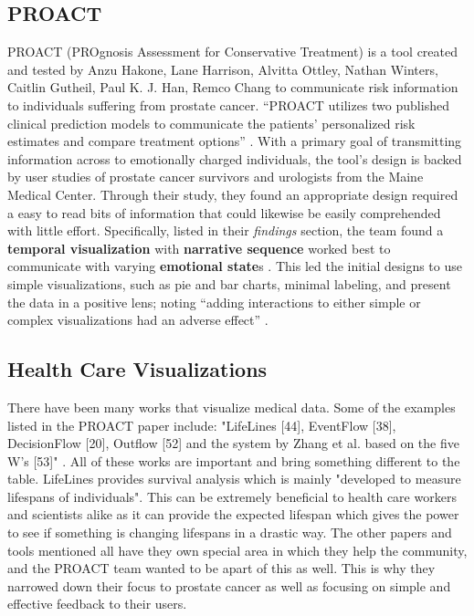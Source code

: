 \documentclass[journal]{vgtc}                %
\begin{document}
        \subsection{PROACT}
                PROACT (PROgnosis Assessment for Conservative Treatment) is a tool created and tested by Anzu Hakone, Lane Harrison, Alvitta Ottley, Nathan Winters, Caitlin Gutheil, Paul K. J. Han, Remco Chang to communicate risk information to individuals suffering from prostate cancer.
                ``PROACT utilizes two published clinical prediction models to communicate the patients’ personalized risk estimates and compare treatment options'' \cite[p.~1]{PROACT:2016}.
                With a primary goal of transmitting information across to emotionally charged individuals, the tool's design is backed by user studies of prostate cancer survivors and urologists from the Maine Medical Center.
                Through their study, they found an appropriate design required a easy to read bits of information that could likewise be easily comprehended with little effort.
                Specifically, listed in their \textit{findings} section, the team found a \textbf{temporal visualization} with \textbf{narrative sequence} worked best to communicate with varying \textbf{emotional state}s \cite[p.~8]{PROACT:2016}.
                This led the initial designs to use simple visualizations, such as pie and bar charts, minimal labeling, and present the data in a positive lens; noting ``adding interactions to either simple or complex visualizations had an adverse effect'' \cite[p.~2]{PROACT:2016}.

        \subsection{Health Care Visualizations}
                There have been many works that visualize medical data.
                Some of the examples listed in the PROACT paper include: "LifeLines [44], EventFlow [38], DecisionFlow [20], Outflow [52] and the system by Zhang et al. based on the five W’s [53]" \cite[p.~2]{PROACT:2016}.
                All of these works are important and bring something different to the table.
                LifeLines provides survival analysis which is mainly "developed to measure lifespans of individuals"\cite{LifeLines:2014}.
                This can be extremely beneficial to health care workers and scientists alike as it can provide the expected lifespan which gives the power to see if something is changing lifespans in a drastic way.
                The other papers and tools mentioned all have they own special area in which they help the community, and the PROACT team wanted to be apart of this as well.
                This is why they narrowed down their focus to prostate cancer as well as focusing on simple and effective feedback to their users.
\end{document}

